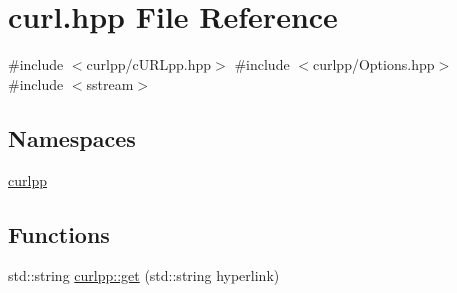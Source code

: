 \hypertarget{a00008}{}\section{curl.\+hpp File Reference}
\label{a00008}
{\ttfamily \#include $<$curlpp/c\+U\+R\+Lpp.\+hpp$>$}\newline
{\ttfamily \#include $<$curlpp/\+Options.\+hpp$>$}\newline
{\ttfamily \#include $<$sstream$>$}\newline
\subsection*{Namespaces}
\begin{DoxyCompactItemize}
\item 
 \hyperlink{a00035}{curlpp}
\end{DoxyCompactItemize}
\subsection*{Functions}
\begin{DoxyCompactItemize}
\item 
std\+::string \hyperlink{a00035_acbba0862979b2ae3a4d2a73369f42820}{curlpp\+::get} (std\+::string hyperlink)
\end{DoxyCompactItemize}
